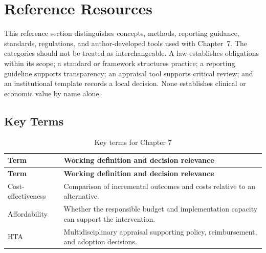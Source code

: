 \section{Reference Resources}
\label{sec:comp-ch07-reference}

This reference section distinguishes concepts, methods, reporting guidance,
standards, regulations, and author-developed tools used with Chapter~7. The
categories should not be treated as interchangeable. A law establishes obligations
within its scope; a standard or framework structures practice; a reporting guideline
supports transparency; an appraisal tool supports critical review; and an
institutional template records a local decision. None establishes clinical or
economic value by name alone. 

\subsection{Key Terms}
\begin{longtable}{@{}p{}p{}@{}}
\caption{Key terms for Chapter 7}
\label{tab:comp-ch07-key-terms}\\
\toprule
\textbf{Term} & \textbf{Working definition and decision relevance} \\
\midrule
\endfirsthead
\toprule
\textbf{Term} & \textbf{Working definition and decision relevance} \\
\midrule
\endhead
\bottomrule
\endlastfoot
Cost-effectiveness & Comparison of incremental outcomes and costs relative to an alternative. \\
Affordability & Whether the responsible budget and implementation capacity can support the intervention. \\
HTA & Multidisciplinary appraisal supporting policy, reimbursement, and adoption decisions. \\
\end{longtable}

